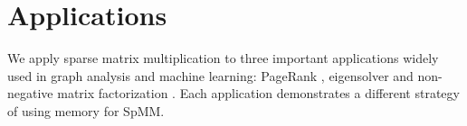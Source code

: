 


\section{Applications} \label{sec:spmm:apps}
We apply sparse matrix multiplication to three important applications widely
used in graph analysis and machine learning: PageRank \cite{pagerank},
eigensolver \cite{anasazi} and non-negative matrix factorization \cite{nmf}.
Each application demonstrates a different strategy of using memory for SpMM.

